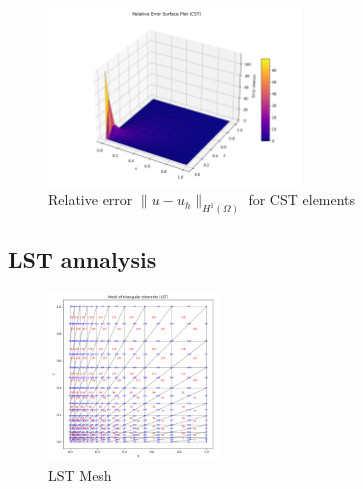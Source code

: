 \begin{figure}[H]
\centering
\includegraphics[width=0.6\textwidth]{GRAFICOS/CST/CST_relative_error_surface_plot.png}
\caption{Relative error \(\|u - u_h\|_{H^1(\Omega)}\) for CST elements}
\label{fig:cst_error_vs_h}
\end{figure}


\subsection{LST annalysis}

\begin{figure}[H]
\centering
\includegraphics[width=0.4\textwidth]{GRAFICOS/LST/LST_mesh_plot.png}
\caption{LST Mesh}
\label{fig:lst_results}
\end{figure}

